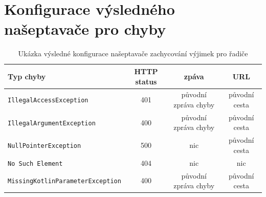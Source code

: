 \chapter{Konfigurace výsledného našeptavače pro chyby}\label{dodatek:excpetion-handler2}
    \begin{table} \centering
            \caption[Konfigurace výsledného našeptavače pro řadiče]{Ukázka výsledné konfigurace našeptavače zachycování výjimek pro řadiče}
            \begin{tabular}{|l|c|c|c|}\hline
        	  Typ chyby		& HTTP status		& zpáva	& URL 	\tabularnewline \hline \hline
        	  \texttt{IllegalAccessException}	& 401	& původní zpráva chyby		& původní cesta     \tabularnewline \hline
        	  \texttt{IllegalArgumentException}	& 400	& původní zpráva chyby		& původní cesta     \tabularnewline \hline
        	  \texttt{NullPointerException}	& 500	& nic		& původní cesta     \tabularnewline \hline
        	  \texttt{No Such Element}	& 404	& nic		& nic     \tabularnewline \hline
        	  \texttt{MissingKotlinParameterException}	& 400	& původní zpráva chyby		& původní cesta     \tabularnewline \hline
            \end{tabular}
    \end{table}
